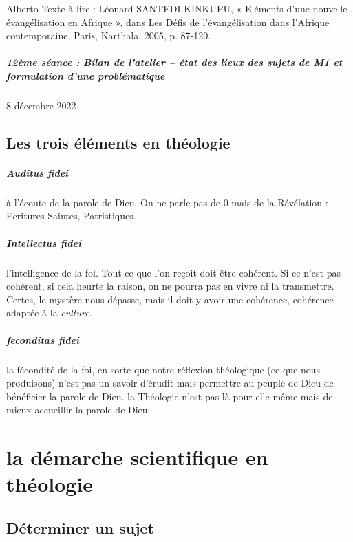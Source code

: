 Alberto
Texte à lire : Léonard SANTEDI KINKUPU, « Eléments d’une nouvelle évangélisation en Afrique », dans Les Défis de l’évangélisation dans l’Afrique contemporaine, Paris, Karthala, 2005, p. 87-120.



\paragraph{12ème séance : Bilan de l’atelier – état des lieux des sujets de M1 et formulation d’une problématique}   8 décembre 2022




\section{Les trois éléments en théologie}

\paragraph{Auditus fidei} à l'écoute de la parole de Dieu. On ne parle pas de 0 mais de la Révélation : Ecritures Saintes, Patristiques. 

\paragraph{Intellectus fidei} l'intelligence de la foi. Tout ce que l'on reçoit doit être cohérent. Si ce n'est pas cohérent, si cela heurte la raison, on ne pourra pas en vivre ni la transmettre. Certes, le mystère nous dépasse, mais il doit y avoir une cohérence, cohérence adaptée à la \textit{culture}. 

\paragraph{feconditas fidei} la fécondité de la foi, en sorte que notre réflexion théologique (ce que nous produisons) n'est pas un savoir d'érudit mais permettre au peuple de Dieu de bénéficier la parole de Dieu. la Théologie n'est pas là pour elle même mais de mieux accueillir la parole de  Dieu. 


 \chapter{la démarche scientifique en théologie}


\section{Déterminer un sujet}

